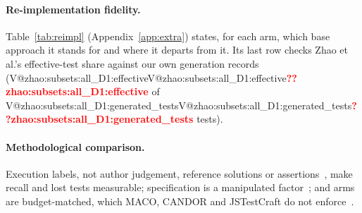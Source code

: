 \documentclass[pdflatex,iicol,sn-mathphys-num]{sn-jnl}
\makeatletter
\newcommand{\V}[1]{\ifcsname V@#1\endcsname\csname V@#1\endcsname\else\textbf{\textcolor{red}{??#1}}\fi}
\makeatother
\begin{document}
\begin{appendices}
\paragraph{Re-implementation fidelity.} Table~\ref{tab:reimpl} (Appendix~\ref{app:extra}) states, for each arm, which base approach it stands for and where it departs from it. Its last row checks Zhao et al.'s effective-test share against our own generation records (\V{zhao:subsets:all_D1:effective} of \V{zhao:subsets:all_D1:generated_tests} tests).

\paragraph{Methodological comparison.} Execution labels, not author judgement, reference solutions or assertions~\cite{liu2026jstestcraft,taherkhani2026valtest,hayet2025chatassert}, make recall and lost tests measurable; specification is a manipulated factor~\cite{xu2026candor,li2026mitgen}; and arms are budget-matched, which MACO, CANDOR and JSTestCraft do not enforce~\cite{xie2026maco,xu2026candor,liu2026jstestcraft}.


\end{appendices}
\end{document}
